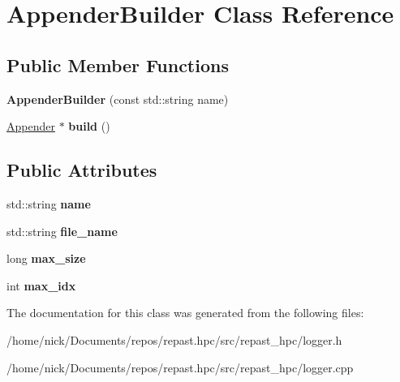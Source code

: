 \hypertarget{class_appender_builder}{\section{Appender\-Builder Class Reference}
\label{class_appender_builder}
}
\subsection*{Public Member Functions}
\begin{DoxyCompactItemize}
\item 
\hypertarget{class_appender_builder_a54ef7bfe2a4bc324957ef673be25ee82}{{\bfseries Appender\-Builder} (const std\-::string name)}\label{class_appender_builder_a54ef7bfe2a4bc324957ef673be25ee82}

\item 
\hypertarget{class_appender_builder_a8f0364cb9215568f44ce573cd8b9b3f0}{\hyperlink{class_appender}{Appender} $\ast$ {\bfseries build} ()}\label{class_appender_builder_a8f0364cb9215568f44ce573cd8b9b3f0}

\end{DoxyCompactItemize}
\subsection*{Public Attributes}
\begin{DoxyCompactItemize}
\item 
\hypertarget{class_appender_builder_ad6d1b5b3182271c7f4dd218b53f7a085}{std\-::string {\bfseries name}}\label{class_appender_builder_ad6d1b5b3182271c7f4dd218b53f7a085}

\item 
\hypertarget{class_appender_builder_a93c3125ddcbec42cd549b39cb856761e}{std\-::string {\bfseries file\-\_\-name}}\label{class_appender_builder_a93c3125ddcbec42cd549b39cb856761e}

\item 
\hypertarget{class_appender_builder_a04ea0440c189ddf1b1e150be593878b8}{long {\bfseries max\-\_\-size}}\label{class_appender_builder_a04ea0440c189ddf1b1e150be593878b8}

\item 
\hypertarget{class_appender_builder_a30816a915e8878a0af244ee45705a4cc}{int {\bfseries max\-\_\-idx}}\label{class_appender_builder_a30816a915e8878a0af244ee45705a4cc}

\end{DoxyCompactItemize}


The documentation for this class was generated from the following files\-:\begin{DoxyCompactItemize}
\item 
/home/nick/\-Documents/repos/repast.\-hpc/src/repast\-\_\-hpc/logger.\-h\item 
/home/nick/\-Documents/repos/repast.\-hpc/src/repast\-\_\-hpc/logger.\-cpp\end{DoxyCompactItemize}
